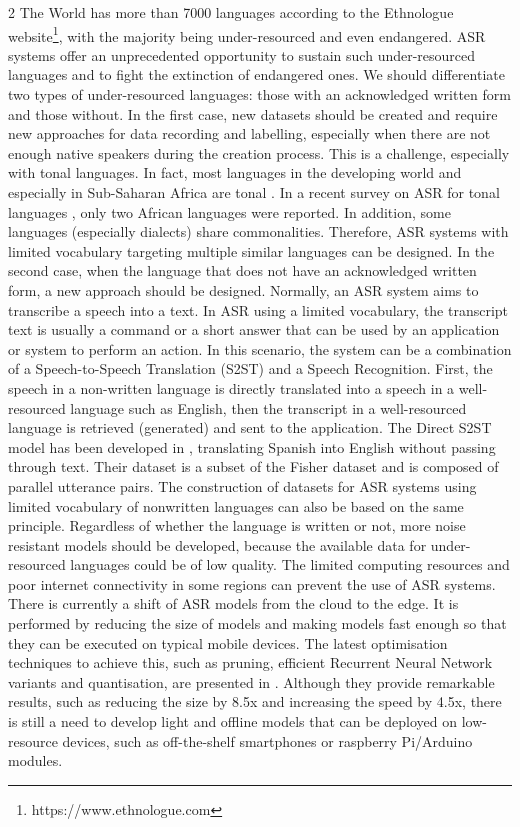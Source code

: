 \begin{multicols}{2}
The World has more than 7000 languages according to the Ethnologue website\footnote{https://www.ethnologue.com}, with the majority being under-resourced and even endangered. ASR systems offer an unprecedented opportunity to sustain such under-resourced languages and to fight the extinction of endangered ones. We should differentiate two types of under-resourced languages: those with an acknowledged written form and those without. In the first case, new datasets should be created and require new approaches for data recording and labelling, especially when there are not enough native speakers during the creation process. This is a challenge, especially with tonal languages. In fact, most languages in the developing world and especially in Sub-Saharan Africa are tonal . In a  recent survey on ASR for tonal languages , only two African languages were reported. In addition, some languages (especially dialects) share commonalities. Therefore, ASR systems with limited vocabulary targeting multiple similar languages can be designed. 
In the second case, when the language that does not have an acknowledged written form, a new approach should be designed. Normally, an ASR system aims to transcribe a speech into a text.  In ASR using a limited vocabulary, the transcript text is usually a command or a short answer that can be used by an application or system to perform an action. In this scenario, the system can be a combination of a Speech-to-Speech Translation (S2ST) and a Speech Recognition. First, the speech in a non-written language is directly translated into a speech in a well-resourced language such as English, then the transcript in a well-resourced language is retrieved (generated) and sent to the application. The Direct S2ST model has been developed in , translating Spanish into English without passing through text. Their dataset is a subset of the Fisher dataset and is composed of parallel utterance pairs. The construction of datasets for ASR systems using limited vocabulary of nonwritten languages can also be based on the same principle.
Regardless of whether the language is written or not, more noise resistant models should be developed, because the available data for under-resourced languages could be of low quality.
The limited computing resources and poor internet connectivity in some regions can prevent the use of ASR systems. There is currently a shift of ASR models from the cloud to the edge. It is performed by reducing the size of models and making models fast enough so that they can be executed on typical mobile devices. The latest optimisation techniques to achieve this, such as pruning, efficient Recurrent Neural Network variants and quantisation, are presented in . Although they provide remarkable results, such as reducing the size by 8.5x and increasing the speed by 4.5x, there is still a need to develop light and offline models that can be deployed on low-resource devices, such as off-the-shelf smartphones or raspberry Pi/Arduino modules.


\end{multicols}
